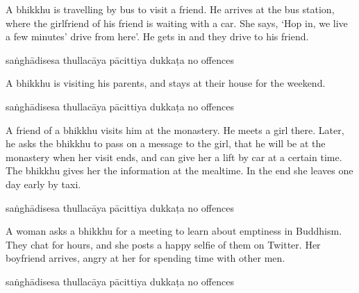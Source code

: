 \begin{exam}{\autoExamName}
\begin{problem*}
\begin{parts}
  \bigskip

\item A bhikkhu is travelling by bus to visit a friend. He arrives at the bus
  station, where the girlfriend of his friend is waiting with a car. She says,
  `Hop in, we live a few minutes' drive from here'. He gets in and they drive to
  his friend.

  \bigskip

  \begin{answers}{5}
    \bChoices
     saṅghādisesa\eAns
     thullacāya\eAns
     pācittiya\eAns
     dukkaṭa\eAns
     no offences\eAns
    \eChoices
  \end{answers}

  \bigskip

\item A bhikkhu is visiting his parents, and stays at their house for the weekend.

  \bigskip

  \begin{answers}{5}
    \bChoices
     saṅghādisesa\eAns
     thullacāya\eAns
     pācittiya\eAns
     dukkaṭa\eAns
     no offences\eAns
    \eChoices
  \end{answers}

  \bigskip

\item A friend of a bhikkhu visits him at the monastery. He meets a girl there.
  Later, he asks the bhikkhu to pass on a message to the girl, that he will be
  at the monastery when her visit ends, and can give her a lift by car at a
  certain time. The bhikkhu gives her the information at the mealtime. In the
  end she leaves one day early by taxi. 

  \bigskip

  \begin{answers}{5}
    \bChoices
     saṅghādisesa\eAns
     thullacāya\eAns
     pācittiya\eAns
     dukkaṭa\eAns
     no offences\eAns
    \eChoices
  \end{answers}

  \bigskip

\item A woman asks a bhikkhu for a meeting to learn about emptiness in Buddhism.
  They chat for hours, and she posts a happy selfie of them on Twitter. Her
  boyfriend arrives, angry at her for spending time with other men.

  \bigskip

  \begin{answers}{5}
    \bChoices
     saṅghādisesa\eAns
     thullacāya\eAns
     pācittiya\eAns
     dukkaṭa\eAns
     no offences\eAns
    \eChoices
  \end{answers}


\end{parts}
\end{problem*}
\end{exam}
